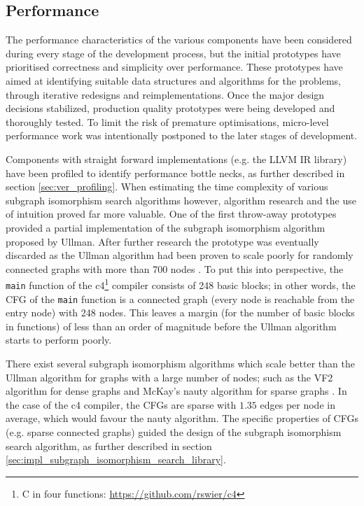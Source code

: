 
\subsection{Performance}
\label{sec:ver_performance}

The performance characteristics of the various components have been considered during every stage of the development process, but the initial prototypes have prioritised correctness and simplicity over performance. These prototypes have aimed at identifying suitable data structures and algorithms for the problems, through iterative redesigns and reimplementations. Once the major design decisions stabilized, production quality prototypes were being developed and thoroughly tested. To limit the risk of premature optimisations, micro-level performance work was intentionally postponed to the later stages of development.

Components with straight forward implementations (e.g. the LLVM IR library) have been profiled to identify performance bottle necks, as further described in section \ref{sec:ver_profiling}. When estimating the time complexity of various subgraph isomorphism search algorithms however, algorithm research and the use of intuition proved far more valuable. One of the first throw-away prototypes provided a partial implementation of the subgraph isomorphism algorithm proposed by Ullman. After further research the prototype was eventually discarded as the Ullman algorithm had been proven to scale poorly for randomly connected graphs with more than 700 nodes \cite{iso_performance_comparison}. To put this into perspective, the \texttt{main} function of the c4\footnote{C in four functions: \url{https://github.com/rswier/c4}} compiler consists of 248 basic blocks; in other words, the CFG of the \texttt{main} function is a connected graph (every node is reachable from the entry node) with 248 nodes. This leaves a margin (for the number of basic blocks in functions) of less than an order of magnitude before the Ullman algorithm starts to perform poorly.

There exist several subgraph isomorphism algorithms which scale better than the Ullman algorithm for graphs with a large number of nodes; such as the VF2 algorithm for dense graphs and McKay's nauty algorithm for sparse graphs \cite{iso_performance_comparison,subgraph_isomorphism_algorithms}. In the case of the c4 compiler, the CFGs are sparse with $ 1.35 $ edges per node in average, which would favour the nauty algorithm. The specific properties of CFGs (e.g. sparse connected graphs) guided the design of the subgraph isomorphism search algorithm, as further described in section \ref{sec:impl_subgraph_isomorphism_search_library}.

